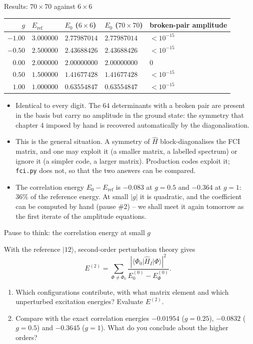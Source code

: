 \documentclass[aspectratio=169,10pt]{beamer}
\newcounter{thinkctr}
\newcommand{\thinkq}[2]{%
  \stepcounter{thinkctr}%
  \begin{tcolorbox}[colback=palewarm,colframe=warm,title={\bfseries Pause to think \#\thethinkctr\hfill\mdseries\small(about #1 min -- discuss with your neighbour)},fonttitle=\bfseries]
  #2
  \end{tcolorbox}}
\newcommand{\ket}[1]{\vert #1\rangle}
\newcommand{\element}[3]{\langle #1\vert #2\vert #3\rangle}
\begin{document}
\begin{frame}{Results: $70\times70$ against $6\times6$}
  \small
  \begin{center}
  \renewcommand{\arraystretch}{1.15}
  \begin{tabular}{rllll}
    \toprule
    $g$ & $E_{\mathrm{ref}}$ & $E_0$ ($6\times6$) & $E_0$ ($70\times70$) & broken-pair amplitude\\
    \midrule
    $-1.00$ & $3.000000$ & $2.77987014$ & $2.77987014$ & $<10^{-15}$\\
    $-0.50$ & $2.500000$ & $2.43688426$ & $2.43688426$ & $<10^{-15}$\\
    $0.00$  & $2.000000$ & $2.00000000$ & $2.00000000$ & $0$\\
    $0.50$  & $1.500000$ & $1.41677428$ & $1.41677428$ & $<10^{-15}$\\
    $1.00$  & $1.000000$ & $0.63554847$ & $0.63554847$ & $<10^{-15}$\\
    \bottomrule
  \end{tabular}
  \end{center}
  \begin{itemize}
    \item Identical to every digit. The $64$ determinants with a broken pair are present in the basis but carry no amplitude in the ground state: the symmetry that chapter 4 imposed by hand is \alert{recovered automatically} by the diagonalisation.
    \item This is the general situation. A symmetry of $\hat{H}$ block-diagonalises the FCI matrix, and one may exploit it (a smaller matrix, a labelled spectrum) or ignore it (a simpler code, a larger matrix). Production codes exploit it; \texttt{fci.py} does not, so that the two answers can be compared.
    \item The correlation energy $E_0-E_{\mathrm{ref}}$ is $-0.083$ at $g=0.5$ and $-0.364$ at $g=1$: $36\%$ of the reference energy. At small $|g|$ it is quadratic, and the coefficient can be computed by hand (pause \#2) -- we shall meet it again tomorrow as the first iterate of the amplitude equations.
  \end{itemize}
\end{frame}

\begin{frame}{Pause to think: the correlation energy at small $g$}
  \thinkq{4}{With the reference $\ket{12}$, second-order perturbation theory gives
  \[
    E^{(2)}=\sum_{\Phi\neq\Phi_0}\frac{|\element{\Phi_0}{\hat{H}_I}{\Phi}|^2}{E_0^{(0)}-E_\Phi^{(0)}} .
  \]
  \begin{enumerate}
    \item Which configurations contribute, with what matrix element and which unperturbed excitation energies? Evaluate $E^{(2)}$.
    \item Compare with the exact correlation energies $-0.01954$ ($g=0.25$), $-0.0832$ ($g=0.5$) and $-0.3645$ ($g=1$). What do you conclude about the higher orders?
  \end{enumerate}}
\end{frame}
\end{document}
